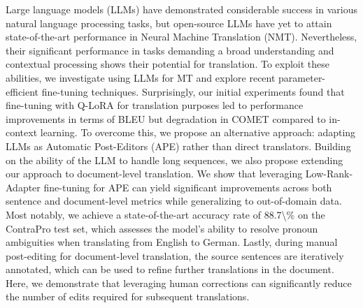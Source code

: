 Large language models (LLMs) have demonstrated considerable success in various natural language processing tasks, but open-source LLMs have yet to attain state-of-the-art performance in Neural Machine Translation (NMT). Nevertheless, their significant performance in tasks demanding a broad understanding and contextual processing shows their potential for translation. To exploit these abilities, we investigate using LLMs for MT and explore recent parameter-efficient fine-tuning techniques. Surprisingly, our initial experiments found that fine-tuning with Q-LoRA for translation purposes led to performance improvements in terms of BLEU but degradation in COMET compared to in-context learning. To overcome this, we propose an alternative approach: adapting LLMs as Automatic Post-Editors (APE) rather than direct translators. Building on the ability of the LLM to handle long sequences, we also propose extending our approach to document-level translation. We show that leveraging Low-Rank-Adapter fine-tuning for APE can yield significant improvements across both sentence and document-level metrics while generalizing to out-of-domain data. Most notably, we achieve a state-of-the-art accuracy rate of 88.7\textbackslash{}\% on the ContraPro test set, which assesses the model's ability to resolve pronoun ambiguities when translating from English to German. Lastly, during manual post-editing for document-level translation, the source sentences are iteratively annotated, which can be used to refine further translations in the document. Here, we demonstrate that leveraging human corrections can significantly reduce the number of edits required for subsequent translations.